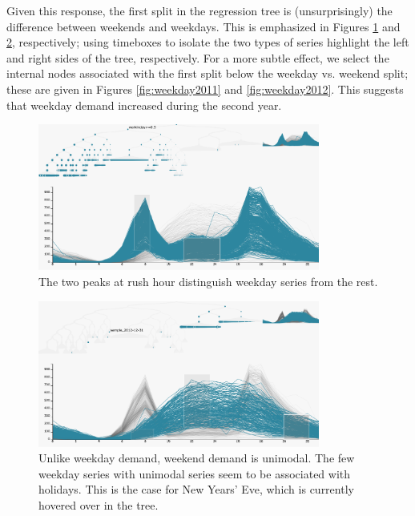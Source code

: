 \documentclass[12pt]{article}
\begin{document}
Given this response, the first split in the regression tree is
(unsurprisingly) the difference between weekends and weekdays. This is
emphasized in Figures \ref{fig:working} and \ref{fig:weekend}, respectively;
using timeboxes to isolate the two types of series highlight the left and right
sides of the tree, respectively. For a more subtle effect, we select the
internal nodes associated with the first split below the weekday vs. weekend
split; these are given in Figures \ref{fig:weekday2011} and
\ref{fig:weekday2012}. This suggests that weekday demand increased during the
second year.

\begin{figure}

{\centering \includegraphics[width=350px]{figure/working}

}

\caption{The two peaks at rush hour distinguish weekday series from the
  rest.}\label{fig:working}
\end{figure}

\begin{figure}

{\centering \includegraphics[width=350px]{figure/weekend}

}

\caption{Unlike weekday demand, weekend demand is unimodal. The few weekday
  series with unimodal series seem to be associated with holidays. This is the
  case for New Years' Eve, which is currently hovered over in the
  tree.}\label{fig:weekend}
\end{figure}
\end{document}
